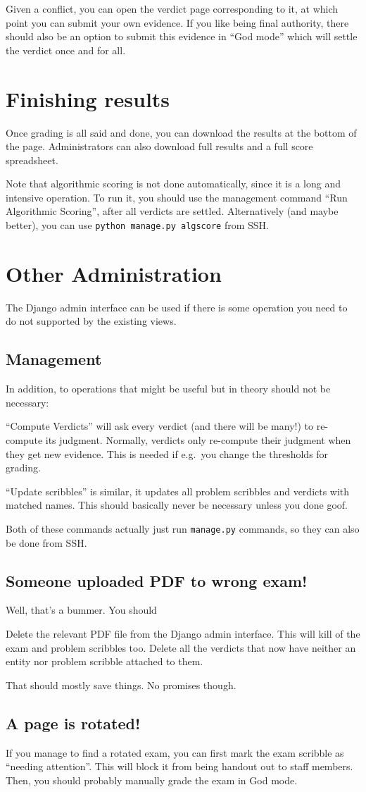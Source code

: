 Given a conflict, you can open the verdict page corresponding to it,
at which point you can submit your own evidence.
If you like being final authority,
there should also be an option to submit this evidence in ``God mode''
which will settle the verdict once and for all.
\section{Finishing results}
Once grading is all said and done,
you can download the results at the bottom of the page.
Administrators can also download full results
and a full score spreadsheet.

Note that algorithmic scoring is not done automatically,
since it is a long and intensive operation.
To run it, you should use the management command
``Run Algorithmic Scoring'',
after all verdicts are settled.
Alternatively (and maybe better), you can use
\verb+python manage.py algscore+ from SSH.

\section{Other Administration}
The Django admin interface can be used if there
is some operation you need to do not supported by the existing views.

\subsection{Management}
In addition, to operations that might be useful
but in theory should not be necessary:
\begin{itemize}
	\ii ``Compute Verdicts'' will ask every verdict (and there will be many!)
	to re-compute its judgment.
	Normally, verdicts only re-compute their judgment when they get new evidence.
	This is needed if e.g.\ you change the thresholds for grading.

	\ii ``Update scribbles'' is similar,
	it updates all problem scribbles and verdicts
	with matched names.
	This should basically never be necessary unless you done goof.
\end{itemize}
Both of these commands actually just run \verb+manage.py+ commands,
so they can also be done from SSH.

\subsection{Someone uploaded PDF to wrong exam!}
Well, that's a bummer.  You should
\begin{itemize}
	\ii Delete the relevant PDF file from the Django admin interface.
	This will kill of the exam and problem scribbles too.
	\ii Delete all the verdicts that now have neither an entity
	nor problem scribble attached to them.
\end{itemize}
That should mostly save things. No promises though.

\subsection{A page is rotated!}
If you manage to find a rotated exam,
you can first mark the exam scribble as ``needing attention''.
This will block it from being handout out to staff members.
Then, you should probably manually grade the exam in God mode.
